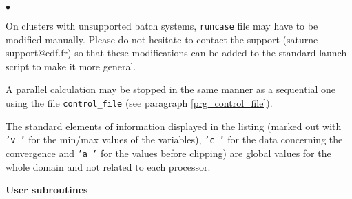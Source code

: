 {{{\begin{list}{$\bullet$}{}
\item On clusters with unsupported batch systems,
      \texttt{runcase} file may have to be modified manually.
      Please do not hesitate to contact the \CS support
      (saturne-support@edf.fr) so that these modifications can be added to
      the standard launch script to make it more general.

\item A parallel calculation may be stopped in the same manner as a
      sequential one using the file \texttt{control\_file} (see paragraph
      \ref{prg_control_file}).

\item The standard elements of information displayed in the listing
      (marked out with \texttt{'v  '} for the min/max values of the
      variables), \texttt{'c  '} for the data concerning the convergence
      and \texttt{'a  '} for the values before clipping) are global
      values for the whole domain and not related to each processor.

\end{list}

\vspace{0.5cm}
{\bf User subroutines}

}}}
